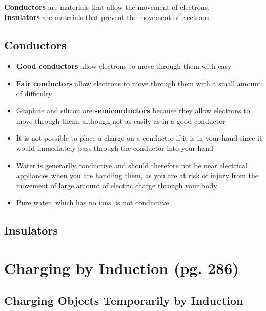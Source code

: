 \documentclass{article}
\begin{document}
    \textbf{Conductors} are materials that allow the movement of electrons.\\
    \textbf{Insulators} are materials that prevent the movement of electrons.\\
    
    \subsection*{Conductors}
    \begin{itemize}
        \item \textbf{Good conductors} allow electrons to move through them with easy
        \item \textbf{Fair conductors} allow electrons to move through them with a small amount of difficulty
        

        \item Graphite and silicon are \textbf{semiconductors} because they allow electrons to move through them, although not as easily as in a good conductor
        \item It is not possible to place a charge on a conductor if it is in your hand since it would immediately pass through the conductor into your hand
        \item Water is generarlly conductive and should therefore not be near electrical appliances when you are handling them, as you are at risk of injury from the movement of large amount of electric charge through your body
        \item Pure water, which has no ions, is not conductive
    \end{itemize}

    \subsection*{Insulators}


\section{Charging by Induction (pg. 286)}

    \subsection*{Charging Objects Temporarily by Induction}
        
\end{document}
